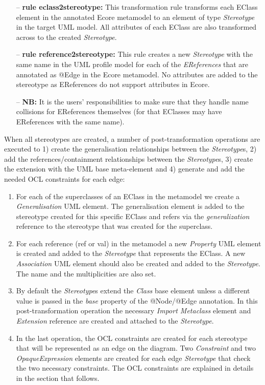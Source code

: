 \begin{itemize}
	\item[--] \textbf{rule eclass2stereotype:} This transformation rule transforms each EClass element in the annotated Ecore metamodel to an element of type \textit{Stereotype} in the target UML model. 
	All attributes of each EClass are also transformed across to the created \textit{Stereotype}. 
	\item[--] \textbf{rule reference2stereotype:} This rule creates a new \textit{Stereotype} with the same name in the UML profile model for each of the \textit{EReferences} that are annotated as @Edge in the Ecore metamodel. 
	No attributes are added to the stereotype as EReferences do not support attributes in Ecore. 
	\item [--] \textbf{NB:} It is the users' responsibilities to make sure that they handle name collisions for EReferences themselves (for that EClasses may have EReferences with the same name).
\end{itemize}

When all stereotypes are created, a number of post-transformation operations are executed to 1) create the generalisation relationships between the \textit{Stereotype}s, 2) add the references/containment relationships between the \textit{Stereotype}s, 3) create the extension with the UML base meta-element and 4) generate and add the needed OCL constraints for each edge: 

\begin{enumerate}[label=\arabic*)]
	\item For each of the superclasses of an EClass in the metamodel we create a \textit{Generalisation} UML element. 
	The generalisation element is added to the stereotype created for this specific EClass and refers via the \textit{generalization} reference to the stereotype that was created for the superclass.
	\item For each reference (ref or val) in the metamodel a new \textit{Property} UML element is created and added to the \textit{Stereotype} that represents the EClass. 
	A new \textit{Association} UML element should also be created and added to the \textit{Stereotype}. The name and the multiplicities are also set.
	\item By default the \textit{Stereotype}s extend the \textit{Class} base element unless a different value is passed in the \textit{base} property of the @Node/@Edge annotation. 
	In this post-transformation operation the necessary \textit{Import Metaclass} element and \textit{Extension} reference are created and attached to the \textit{Stereotype}.
	\item In the last operation, the OCL constraints are created for each stereotype that will be represented as an edge on the diagram. 
	Two \textit{Constraint} and two \textit{OpaqueExpression} elements are created for each edge \textit{Stereotype} that check the two necessary constraints. 
	The OCL constraints are explained in details in the section that follows.
\end{enumerate}

